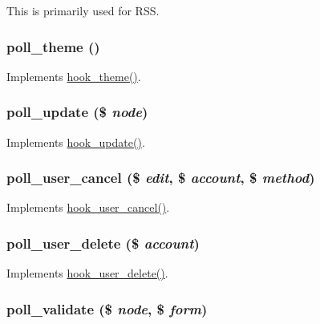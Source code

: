 This is primarily used for RSS. \hypertarget{poll_8module_a05317f75289b6caeeeda960dad1e3b33}{
\subsubsection[{poll\_\-theme}]{\setlength{\rightskip}{0pt plus 5cm}poll\_\-theme ()}}
\label{poll_8module_a05317f75289b6caeeeda960dad1e3b33}
Implements \hyperlink{group__hooks_ga013ccb45c7aaab1c16cf9691428c910d}{hook\_\-theme()}. \hypertarget{poll_8module_a12844962a2a54fcd508fd1284d22e6aa}{
\subsubsection[{poll\_\-update}]{\setlength{\rightskip}{0pt plus 5cm}poll\_\-update (\$ {\em node})}}
\label{poll_8module_a12844962a2a54fcd508fd1284d22e6aa}
Implements \hyperlink{group__node__api__hooks_gaf9c98e3839e9405df42b50c8cdfa9dca}{hook\_\-update()}. \hypertarget{poll_8module_ae5fc3d7e946c2b8984b6ba2c0f19874e}{
\subsubsection[{poll\_\-user\_\-cancel}]{\setlength{\rightskip}{0pt plus 5cm}poll\_\-user\_\-cancel (\$ {\em edit}, \/  \$ {\em account}, \/  \$ {\em method})}}
\label{poll_8module_ae5fc3d7e946c2b8984b6ba2c0f19874e}
Implements \hyperlink{group__hooks_gad6223ddd2f0f52c331df8a3315d9a41e}{hook\_\-user\_\-cancel()}. \hypertarget{poll_8module_aa41b1c9cea9d13a9da3eecc49d555dda}{
\subsubsection[{poll\_\-user\_\-delete}]{\setlength{\rightskip}{0pt plus 5cm}poll\_\-user\_\-delete (\$ {\em account})}}
\label{poll_8module_aa41b1c9cea9d13a9da3eecc49d555dda}
Implements \hyperlink{group__hooks_ga2c0755857e486e8a770b44b496da9929}{hook\_\-user\_\-delete()}. \hypertarget{poll_8module_a42c8123c32a91678ef00d3f09be16a3e}{
\subsubsection[{poll\_\-validate}]{\setlength{\rightskip}{0pt plus 5cm}poll\_\-validate (\$ {\em node}, \/  \$ {\em form})}}
